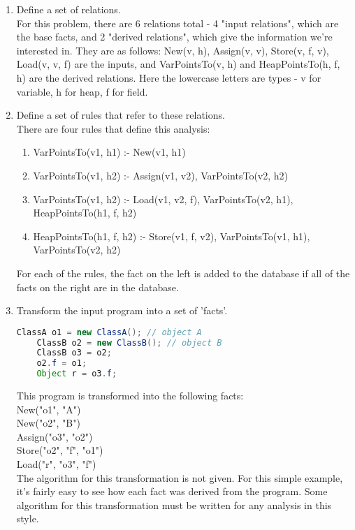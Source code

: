 \documentclass[acmlarge,anonymous]{acmart}\settopmatter{printfolios=true}
\begin{document}
\begin{enumerate}
    \item Define a set of relations.\\
    For this problem, there are 6 relations total - 4 "input relations", which are the base facts, and 2 "derived relations", which give the information we're interested in. They are as follows: New(v, h), Assign(v, v), Store(v, f, v), Load(v, v, f) are the inputs, and VarPointsTo(v, h) and HeapPointsTo(h, f, h) are the derived relations. Here the lowercase letters are types - v for variable, h for heap, f for field.
    \newpage
    
    \item Define a set of rules that refer to these relations.\\
    There are four rules that define this analysis:
    \begin{enumerate}
        \item VarPointsTo(v1, h1) :- New(v1, h1)
        \item VarPointsTo(v1, h2) :- Assign(v1, v2), VarPointsTo(v2, h2)
        \item VarPointsTo(v1, h2) :- Load(v1, v2, f), VarPointsTo(v2, h1), HeapPointsTo(h1, f, h2)
        \item HeapPointsTo(h1, f, h2) :- Store(v1, f, v2), VarPointsTo(v1, h1), VarPointsTo(v2, h2)
    \end{enumerate}
    For each of the rules, the fact on the left is added to the database if all of the facts on the right are in the database.\\
    
    \item Transform the input program into a set of 'facts'.
    \begin{lstlisting}[language=Java]
    ClassA o1 = new ClassA(); // object A
    ClassB o2 = new ClassB(); // object B
    ClassB o3 = o2;
    o2.f = o1;
    Object r = o3.f;
    \end{lstlisting}
    
    This program is transformed into the following facts:\\
    New("o1", "A")\\
    New("o2", "B")\\
    Assign("o3", "o2")\\
    Store("o2", "f", "o1")\\
    Load("r", "o3", "f")\\
    
    The algorithm for this transformation is not given. For this simple example, it's fairly easy to see how each fact was derived from the program. Some algorithm for this transformation must be written for any analysis in this style.\\
    

\end{enumerate}
\end{document}
